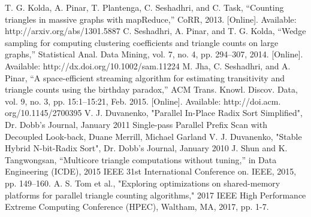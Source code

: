 \documentclass[conference]{IEEEtran}
\begin{document}
\begin{thebibliography}{00}
 T. G. Kolda, A. Pinar, T. Plantenga, C. Seshadhri, and C. Task, “Counting triangles in massive graphs with mapReduce,” CoRR, 2013. [Online]. Available: http://arxiv.org/abs/1301.5887
  C. Seshadhri, A. Pinar, and T. G. Kolda, “Wedge sampling for computing clustering coefficients and triangle counts on large graphs,” Statistical Anal. Data Mining, vol. 7, no. 4, pp. 294–307, 2014. [Online]. Available: http://dx.doi.org/10.1002/sam.11224
 M. Jha, C. Seshadhri, and A. Pinar, “A space-efficient streaming algorithm for estimating transitivity and triangle counts using the birthday paradox,” ACM Trans. Knowl. Discov. Data, vol. 9, no. 3, pp. 15:1–15:21, Feb. 2015. [Online]. Available: http://doi.acm. org/10.1145/2700395
 V. J. Duvanenko, "Parallel In-Place Radix Sort Simplified", Dr. Dobb's Journal, January 2011
 Single-pass Parallel Prefix Scan with Decoupled Look-back, Duane Merrill, Michael Garland
 V. J. Duvanenko, "Stable Hybrid N-bit-Radix Sort", Dr. Dobb's Journal, January 2010
 J. Shun and K. Tangwongsan, “Multicore triangle computations without tuning,” in Data Engineering (ICDE), 2015 IEEE 31st International Conference on. IEEE, 2015, pp. 149–160.
 A. S. Tom et al., "Exploring optimizations on shared-memory platforms for parallel triangle counting algorithms," 2017 IEEE High Performance Extreme Computing Conference (HPEC), Waltham, MA, 2017, pp. 1-7.

\end{thebibliography}
\end{document}
